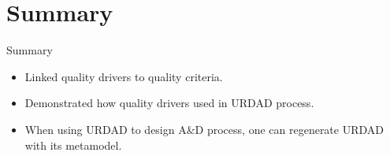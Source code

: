 \section{Summary}

\begin{frame}{Summary}
 \begin{itemize}
  \item<+-| alert@+> Linked quality drivers to quality criteria.
  \item<+-| alert@+> Demonstrated how quality drivers used in URDAD process.
  \item<+-| alert@+> When using URDAD to design A\&D process, one can regenerate URDAD with its metamodel.
 \end{itemize}
\end{frame}
